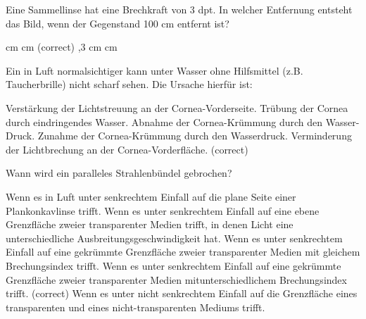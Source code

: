 \documentclass[11pt]{exam}
\begin{document}
\setlength{\voffset}{-0.5in}
\setlength{\headsep}{5pt}

\hspace{2mm}
 \hspace{5mm}
\vspace{4mm}

\begin{questions}

\question Eine Sammellinse hat eine Brechkraft von 3 dpt. In welcher Entfernung entsteht das Bild, wenn der Gegenstand 100 cm entfernt ist?

\begin{choices}
	 cm
	 cm (correct)
	,3 cm
	\choice 150cm
	 cm
\end{choices}

\vspace{3mm}\question Ein in Luft normalsichtiger kann unter Wasser ohne Hilfsmittel (z.B. Taucherbrille) nicht scharf sehen. Die Ursache hierfür ist:

\begin{choices}
	\choice Verstärkung der Lichtstreuung an der Cornea-Vorderseite.
	\choice Trübung der Cornea durch eindringendes Wasser.
	\choice Abnahme der Cornea-Krümmung durch den Wasser-Druck.
	\choice Zunahme der Cornea-Krümmung durch den Wasserdruck.
	\choice Verminderung der Lichtbrechung an der Cornea-Vorderfläche. (correct)
\end{choices}

\vspace{3mm}\question Wann wird ein paralleles Strahlenbündel gebrochen?

\begin{choices}
	\choice Wenn es in Luft unter senkrechtem Einfall auf die plane Seite einer Plankonkavlinse trifft.
	\choice Wenn es unter senkrechtem Einfall auf eine ebene Grenzfläche zweier transparenter Medien trifft, in denen Licht eine unterschiedliche Ausbreitungsgeschwindigkeit hat.
	\choice Wenn es unter senkrechtem Einfall auf eine gekrümmte Grenzfläche zweier transparenter Medien mit gleichem Brechungsindex trifft.
	\choice Wenn es unter senkrechtem Einfall auf eine gekrümmte Grenzfläche zweier transparenter Medien mitunterschiedlichem Brechungsindex trifft. (correct)
	\choice Wenn es unter nicht senkrechtem Einfall auf die Grenzfläche eines transparenten und eines nicht-transparenten Mediums trifft.
\end{choices}


\end{questions}
\end{document}
